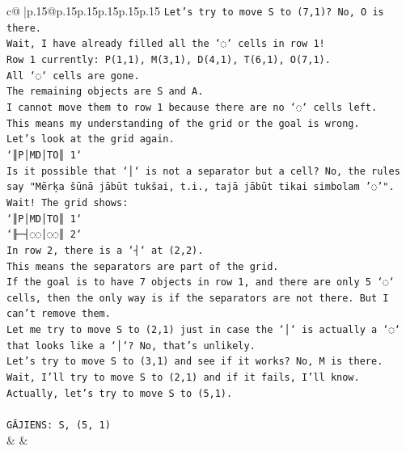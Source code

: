\documentclass{article}
\begin{document}
{\begin{supertabular}{c@{$\;$}|p{.15\linewidth}@{}p{.15\linewidth}p{.15\linewidth}p{.15\linewidth}p{.15\linewidth}p{.15\linewidth}}
{{{\texttt{Let's try to move S to (7,1)? No, O is there.} \\
\texttt{Wait, I have already filled all the `◌` cells in row 1!} \\
\texttt{Row 1 currently: P(1,1), M(3,1), D(4,1), T(6,1), O(7,1).} \\
\texttt{All `◌` cells are gone.} \\
\texttt{The remaining objects are S and A.} \\
\texttt{I cannot move them to row 1 because there are no `◌` cells left.} \\
\texttt{This means my understanding of the grid or the goal is wrong.} \\
\texttt{Let's look at the grid again.} \\
\texttt{`║P│MD│TO║ 1`} \\
\texttt{Is it possible that `│` is not a separator but a cell? No, the rules say "Mērķa šūnā jābūt tukšai, t.i., tajā jābūt tikai simbolam '◌'".} \\
\texttt{Wait! The grid shows:} \\
\texttt{`║P│MD│TO║ 1`} \\
\texttt{`╟─┤◌◌│◌◌║ 2`} \\
\texttt{In row 2, there is a `┤` at (2,2).} \\
\texttt{This means the separators are part of the grid.} \\
\texttt{If the goal is to have 7 objects in row 1, and there are only 5 `◌` cells, then the only way is if the separators are not there. But I can't remove them.} \\
\texttt{Let me try to move S to (2,1) just in case the `│` is actually a `◌` that looks like a `│`? No, that's unlikely.} \\
\texttt{Let's try to move S to (3,1) and see if it works? No, M is there.} \\
\texttt{Wait, I'll try to move S to (2,1) and if it fails, I'll know.} \\
\texttt{Actually, let's try to move S to (5,1).} \\
\\ 
\texttt{GĀJIENS: S, (5, 1)} \\
            }
        }
    }
    & & \\ \\


\end{supertabular}}
\end{document}
